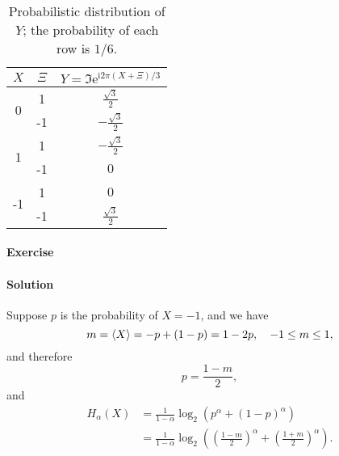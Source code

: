 \documentclass[hyperref, a4paper]{article}
\newcommand*{\ii}{\mathrm{i}}
\newcommand*{\ee}{\mathrm{e}}
\begin{document}
\begin{table}
    \centering
    \caption{Probabilistic distribution of $Y$; the probability of each row is $1/6$.}
    \label{tbl:prob-y}

    \begin{tabular}{ccc}
    \toprule
    $X$                 & $\Xi$ & $Y = \Im \ee^{\ii 2 \pi(X+\Xi) / 3}$ \\ \midrule
    \multirow{2}{*}{0}  & 1     & $\frac{\sqrt{3}}{2}$                 \\
                        & -1    & $-\frac{\sqrt{3}}{2}$                \\ \midrule
    \multirow{2}{*}{1}  & 1     & $-\frac{\sqrt{3}}{2}$                \\
                        & -1    & $0$                                  \\ \midrule
    \multirow{2}{*}{-1} & 1     & $0$                                  \\
                        & -1    & $\frac{\sqrt{3}}{2}$                 \\ \bottomrule 
    \end{tabular}
\end{table}

\paragraph{Exercise }

\paragraph{Solution} Suppose $p$ is the probability of $X = -1$,
and we have 
\begin{equation}
    m = \expval{X} = - p + (1 - p) = 1 - 2p, \quad -1 \leq m \leq 1,
\end{equation}
and therefore 
\begin{equation}
    p = \frac{1 - m}{2}, 
\end{equation}
and 
\begin{equation}
    \begin{aligned}
        H_\alpha(X) &= \frac{1}{1 - \alpha} \log_2(p^{\alpha} + (1 - p)^\alpha) \\
        &= \frac{1}{1 - \alpha} \log_2\left(
            \left( \frac{1 - m}{2} \right)^{\alpha}
            + \left( \frac{1 + m}{2} \right)^{\alpha}
        \right).
    \end{aligned}
\end{equation}
\end{document}
